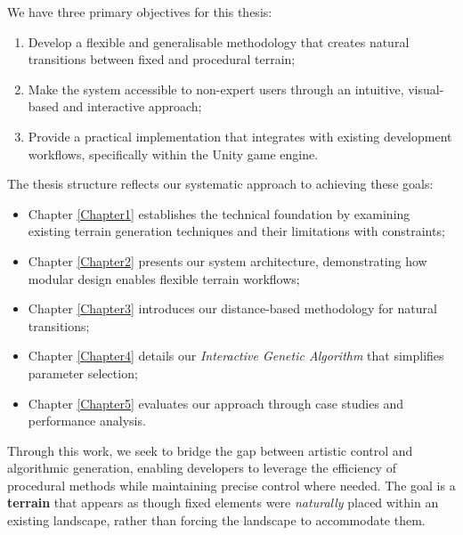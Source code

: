 \hfill

We have three primary objectives for this thesis:
\begin{enumerate}
    \item Develop a flexible and generalisable methodology that creates natural transitions between fixed and procedural terrain;
    \item Make the system accessible to non-expert users through an intuitive, visual-based and interactive approach;
    \item Provide a practical implementation that integrates with existing development workflows, specifically within the Unity game engine.
\end{enumerate}

\hfill

\hfill

The thesis structure reflects our systematic approach to achieving these goals:
\begin{itemize}
    \item Chapter \ref{Chapter1} establishes the technical foundation by examining existing terrain generation techniques and their limitations with constraints;
    \item Chapter \ref{Chapter2} presents our system architecture, demonstrating how modular design enables flexible terrain workflows;
    \item Chapter \ref{Chapter3} introduces our distance-based methodology for natural transitions;
    \item Chapter \ref{Chapter4} details our \textit{Interactive Genetic Algorithm} that simplifies parameter selection;
    \item Chapter \ref{Chapter5} evaluates our approach through case studies and performance analysis. 
\end{itemize}

Through this work, we seek to bridge the gap between artistic control and algorithmic generation, enabling developers to leverage the efficiency of procedural methods while maintaining precise control where needed. The goal is a \textbf{terrain} that appears as though fixed elements were \textit{naturally} placed within an existing landscape, rather than forcing the landscape to accommodate them.
